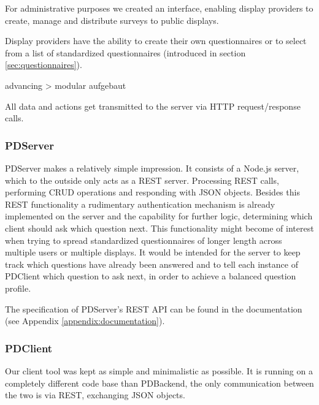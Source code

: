 		For administrative purposes we created an interface, enabling display providers to create, manage and distribute surveys to public displays. 

		Display providers have the ability to create their own questionnaires or to select from a list of standardized questionnaires (introduced in section \ref{sec:questionnaires}).





			advancing > modular aufgebaut


		All data and actions get transmitted to the server via HTTP request/response calls.

	\subsubsection{PDServer}

		PDServer makes a relatively simple impression. It consists of a Node.js server, which to the outside only acts as a REST server. Processing REST calls, performing CRUD operations and responding with JSON objects. Besides this REST functionality a rudimentary authentication mechanism is already implemented on the server and the capability for further logic, determining which client should ask which question next. This functionality might become of interest when trying to spread standardized questionnaires of longer length across multiple users or multiple displays. It would be intended for the server to keep track which questions have already been answered and to tell each instance of PDClient which question to ask next, in order to achieve a balanced question profile.


		The specification of PDServer's REST API can be found in the documentation (see Appendix \ref{appendix:documentation}).



	\subsubsection{PDClient}

		Our client tool was kept as simple and minimalistic as possible. It is running on a completely different code base than PDBackend, the only communication between the two is via REST, exchanging JSON objects.

